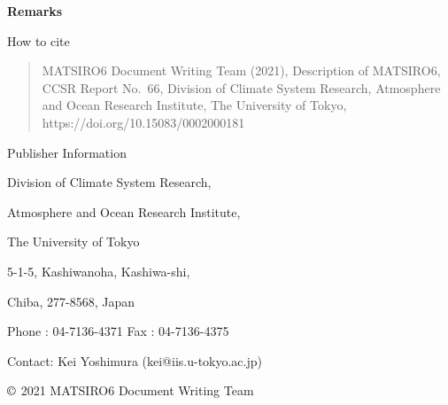 \textbf{Remarks}

\hfill\break
\hfill\break
\hfill\break

How to cite

\begin{quote}
MATSIRO6 Document Writing Team (2021), Description of MATSIRO6, CCSR Report No.~66, Division of Climate System Research, Atmosphere and Ocean Research Institute, The University of Tokyo,
https://doi.org/10.15083/0002000181
\end{quote}

\hfill\break
\hfill\break
\hfill\break

Publisher Information

Division of Climate System Research,

Atmosphere and Ocean Research Institute,

The University of Tokyo

5-1-5, Kashiwanoha, Kashiwa-shi,

Chiba, 277-8568, Japan

Phone : 04-7136-4371 Fax : 04-7136-4375

Contact: Kei Yoshimura (kei@iis.u-tokyo.ac.jp)

\hfill\break
\hfill\break
\hfill\break
\hfill\break

\(\copyright\) 2021 MATSIRO6 Document Writing Team
